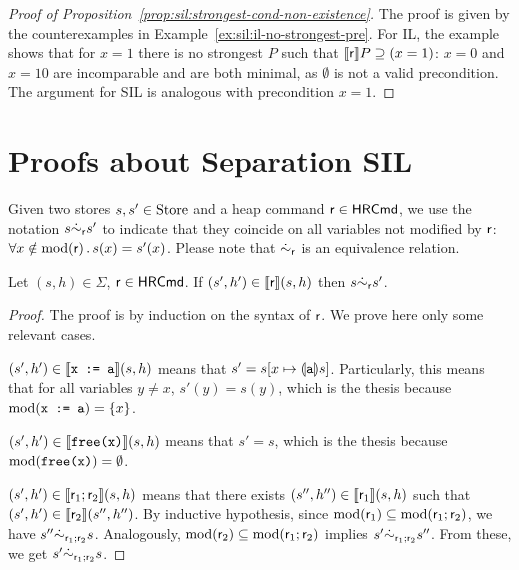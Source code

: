 \begin{proof}[Proof of Proposition~\ref{prop:sil:strongest-cond-non-existence}]
	The proof is given by the counterexamples in Example~\ref{ex:sil:il-no-strongest-pre}.
	For IL, the example shows that for $x = 1$ there is no strongest $P$ such that $\llbracket\mathsf{r}\rrbracket P \supseteq (x = 1)$: $x = 0$ and $x = 10$ are incomparable and are both minimal, as $\emptyset$ is not a valid precondition.
	The argument for SIL is analogous with precondition $x = 1$.
\end{proof}

\section{Proofs about Separation SIL}
Given two stores $s, s' \in \text{Store}$ and a heap command $\mathsf{r} \in \mathsf{HRCmd}$, we use the notation $s \dot\sim_{\mathsf{r}} s'$ to indicate that they coincide on all variables not modified by $\mathsf{r}$: $\forall x \notin \text{mod}(\mathsf{r}) \,.\, s(x) = s'(x)$. Please note that $\dot\sim_{\mathsf{r}}$ is an equivalence relation.

\begin{lemma}\label{lmm:app:store-only-change-mod}
	Let $(s, h) \in \Sigma$, $\mathsf{r} \in \mathsf{HRCmd}$. If $(s', h') \in \llbracket\mathsf{r}\rrbracket(s, h)$ then $s \dot\sim_{\mathsf{r}} s'$.
\end{lemma}
\begin{proof}
	The proof is by induction on the syntax of $\mathsf{r}$. We prove here only some relevant cases.

	$(s', h') \in \llbracket\texttt{x := a}\rrbracket(s, h)$ means that $s' = s[x \mapsto \llparenthesis\texttt{a}\rrparenthesis s]$. Particularly, this means that for all variables $y \neq x$, $s'(y) = s(y)$, which is the thesis because $\text{mod}(\texttt{x := a}) = \{ x \}$.

	$(s', h') \in \llbracket\texttt{free(x)}\rrbracket(s, h)$ means that $s' = s$, which is the thesis because $\text{mod}(\texttt{free(x)}) = \emptyset$.

	$(s', h') \in \llbracket\mathsf{r}_1; \mathsf{r}_2\rrbracket(s, h)$ means that there exists $(s'', h'') \in \llbracket\mathsf{r}_1\rrbracket (s, h)$ such that $(s', h') \in \llbracket\mathsf{r}_2\rrbracket(s'', h'')$. By inductive hypothesis, since $\text{mod}(\mathsf{r}_1) \subseteq \text{mod}(\mathsf{r}_1; \mathsf{r}_2)$, we have $s'' \dot\sim_{\mathsf{r}_1; \mathsf{r}_2} s$. Analogously, $\text{mod}(\mathsf{r}_2) \subseteq \text{mod}(\mathsf{r}_1; \mathsf{r}_2)$ implies $s' \dot\sim_{\mathsf{r}_1; \mathsf{r}_2} s''$. From these, we get $s' \dot\sim_{\mathsf{r}_1; \mathsf{r}_2} s$.
\end{proof}

